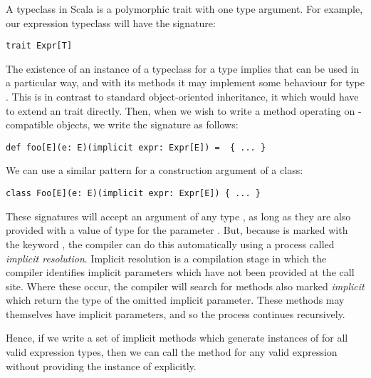 A typeclass in Scala is a polymorphic trait with one type argument. For example, our expression typeclass will have the signature:
\vs \begin{lstlisting}
trait Expr[T]
\end{lstlisting} \vs
The existence of an instance of a typeclass for a type  implies that  can be used in a particular way, and with its methods it may implement some behaviour for type . This is in contrast to standard object-oriented inheritance, it which  would have to extend an  trait directly. Then, when we wish to write a method operating on -compatible objects, we write the signature as follows:
\vs \begin{lstlisting}
def foo[E](e: E)(implicit expr: Expr[E]) =  { ... }
\end{lstlisting} \vs
We can use a similar pattern for a construction argument of a class:
\vs \begin{lstlisting}
class Foo[E](e: E)(implicit expr: Expr[E]) { ... }
\end{lstlisting} \vs

These signatures will accept an argument of any type , as long as they are also provided with a value of type  for the parameter . But, because  is marked with the keyword , the compiler can do this automatically using a process called \textit{implicit resolution}. Implicit resolution is a compilation stage in which the compiler identifies implicit parameters which have not been provided at the call site. Where these occur, the compiler will search for methods also marked \textit{implicit} which return the type of the omitted implicit parameter. These methods may themselves have implicit parameters, and so the process continues recursively.

Hence, if we write a set of implicit methods which generate instances of  for all valid expression types, then we can call the method  for any valid expression without providing the instance of  explicitly.

